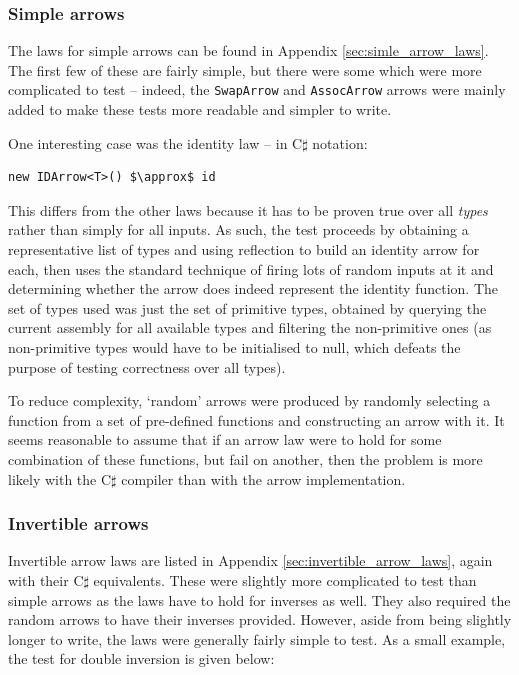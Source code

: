 \documentclass[12pt,twoside,notitlepage]{report}
\begin{document}
\subsubsection{Simple arrows}

The laws for simple arrows can be found in Appendix \ref{sec:simle_arrow_laws}. The first few of these are fairly simple, but there were some which were more complicated to test -- indeed, the \texttt{SwapArrow} and \texttt{AssocArrow} arrows were mainly added to make these tests more readable and simpler to write.

One interesting case was the identity law -- in C$\sharp$ notation:

\begin{lstlisting}[mathescape]
new IDArrow<T>() $\approx$ id
\end{lstlisting}

This differs from the other laws because it has to be proven true over all \textit{types} rather than simply for all inputs. As such, the test proceeds by obtaining a representative list of types and using reflection to build an identity arrow for each, then uses the standard technique of firing lots of random inputs at it and determining whether the arrow does indeed represent the identity function. The set of types used was just the set of primitive types, obtained by querying the current assembly for all available types and filtering the non-primitive ones (as non-primitive types would have to be initialised to null, which defeats the purpose of testing correctness over all types).

To reduce complexity, `random' arrows were produced by randomly selecting a function from a set of pre-defined functions and constructing an arrow with it. It seems reasonable to assume that if an arrow law were to hold for some combination of these functions, but fail on another, then the problem is more likely with the C$\sharp$ compiler than with the arrow implementation.

\subsubsection{Invertible arrows}

Invertible arrow laws are listed in Appendix \ref{sec:invertible_arrow_laws}, again with their C$\sharp$ equivalents. These were slightly more complicated to test than simple arrows as the laws have to hold for inverses as well. They also required the random arrows to have their inverses provided. However, aside from being slightly longer to write, the laws were generally fairly simple to test. As a small example, the test for double inversion is given below:
\end{document}
